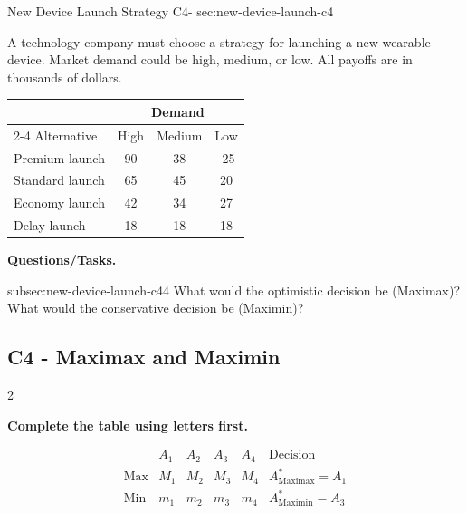 	\sectionScored
	{New Device Launch Strategy}
	{C4-}
	{sec:new-device-launch-c4}
	{
		A technology company must choose a strategy for launching a new wearable
		device. Market demand could be high, medium, or low. All payoffs are in
		thousands of dollars.
		
		\begin{center}
			\renewcommand{\arraystretch}{1.3}
			\small
			\begin{tabular}{lccc}
				\toprule
				& \multicolumn{3}{c}{Demand} \\
				\cmidrule(lr){2-4}
				Alternative & High & Medium & Low \\
				\midrule
				Premium launch & 90 & 38 & -25 \\
				Standard launch & 65 & 45 & 20 \\
				Economy launch & 42 & 34 & 27 \\
				Delay launch & 18 & 18 & 18 \\
				\bottomrule
			\end{tabular}
		\end{center}
		\vspace{-5mm}
		
		\textbf{Questions/Tasks.}
		\begin{enumerate}
			\CriterionTask
			{subsec:new-device-launch-c4}{4}
			{What would the optimistic decision be (Maximax)? What would the conservative decision be (Maximin)? }
		\end{enumerate}
		
		\label{subsec:new-device-launch-c4}
		\subsection*{C4 - Maximax and Maximin }
		
		
		\begin{multicols}{2}
			
			\textbf{Complete the table using letters first.}
			
			\[
			\begin{array}{c|ccccc}
				& A_1 & A_2 & A_3 & A_4 & \text{Decision}\\
				\hline
				\text{Max} &
				M_1 & M_2 & M_3 & M_4 &
				A^*_{\mathrm{Maximax}}=A_1
				\\
				\text{Min} &
				m_1 & m_2 & m_3 & m_4 &
				A^*_{\mathrm{Maximin}}=A_3
			\end{array}
			\]
			

\end{multicols}}
